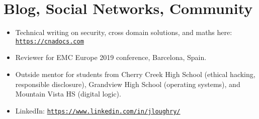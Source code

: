 \section*{Blog, Social Networks, Community}
\vspace{-3mm}

\begin{itemize}
    \item Technical writing on security, cross domain solutions, and maths
        here:
        \href{https://cnadocs.com}{\nolinkurl{https://cnadocs.com}}\vspace{-3mm}
    \item Reviewer for EMC Europe 2019 conference, Barcelona,
        Spain.\vspace{-3mm}
    \item Outside mentor for students from Cherry Creek High School
        (ethical hacking, responsible disclosure), Grandview High School
        (operating systems), and Mountain Vista HS (digital logic).\vspace{-3mm}
    \item LinkedIn:
        \href{https://www.linkedin.com/in/jloughry/}{\nolinkurl{https://www.linkedin.com/in/jloughry/}}
\end{itemize}

